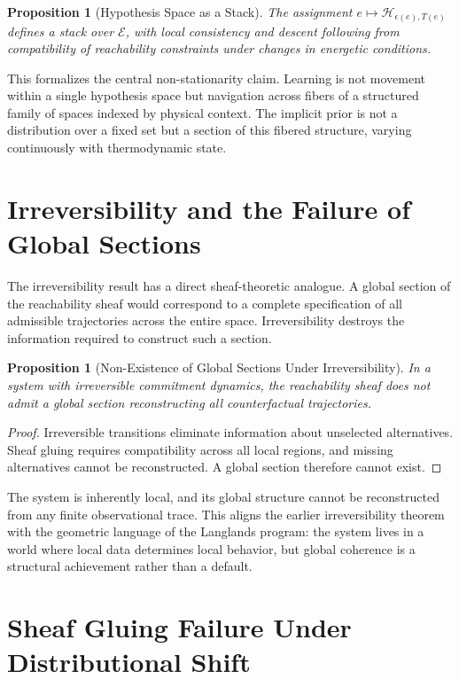 \documentclass[12pt]{article}
\theoremstyle{plain}
\newtheorem{proposition}[theorem]{Proposition}
\theoremstyle{definition}
\theoremstyle{remark}
\begin{document}
\begin{proposition}[Hypothesis Space as a Stack]
The assignment $e \mapsto \mathcal{H}_{\epsilon(e),T(e)}$ defines a stack over $\mathcal{E}$, with local consistency and descent following from compatibility of reachability constraints under changes in energetic conditions.
\end{proposition}

This formalizes the central non-stationarity claim. Learning is not movement within a single hypothesis space but navigation across fibers of a structured family of spaces indexed by physical context. The implicit prior is not a distribution over a fixed set but a section of this fibered structure, varying continuously with thermodynamic state.

\section{Irreversibility and the Failure of Global Sections}

The irreversibility result has a direct sheaf-theoretic analogue. A global section of the reachability sheaf would correspond to a complete specification of all admissible trajectories across the entire space. Irreversibility destroys the information required to construct such a section.

\begin{proposition}[Non-Existence of Global Sections Under Irreversibility]
In a system with irreversible commitment dynamics, the reachability sheaf does not admit a global section reconstructing all counterfactual trajectories.
\end{proposition}

\begin{proof}
Irreversible transitions eliminate information about unselected alternatives. Sheaf gluing requires compatibility across all local regions, and missing alternatives cannot be reconstructed. A global section therefore cannot exist.
\end{proof}

The system is inherently local, and its global structure cannot be reconstructed from any finite observational trace. This aligns the earlier irreversibility theorem with the geometric language of the Langlands program: the system lives in a world where local data determines local behavior, but global coherence is a structural achievement rather than a default.

\section{Sheaf Gluing Failure Under Distributional Shift}
\end{document}
